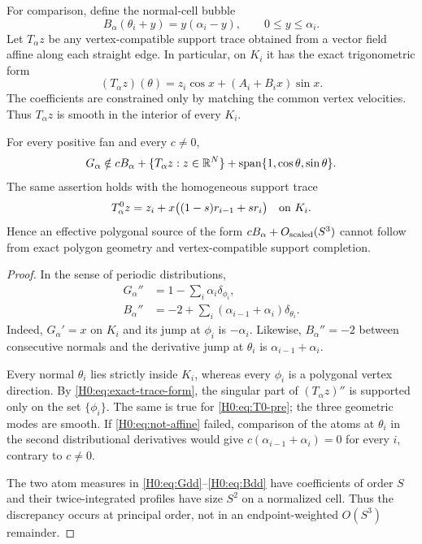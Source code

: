 For comparison, define the normal-cell bubble
\begin{equation}\label{H0:eq:B}
 B_\alpha(\theta_i+y)=y(\alpha_i-y),
 \qquad 0\le y\le\alpha_i.
\end{equation}
Let $T_\alpha z$ be any vertex-compatible support trace obtained from a
vector field affine along each straight edge.  In particular, on $K_i$ it
has the exact trigonometric form
\begin{equation}\label{H0:eq:exact-trace-form}
 (T_\alpha z)(\theta)
 =z_i\cos x+(A_i+B_i x)\sin x.
\end{equation}
The coefficients are constrained only by matching the common vertex
velocities.  Thus $T_\alpha z$ is smooth in the interior of every $K_i$.

\begin{proposition}\label{H0:prop:obstruction}
For every positive fan and every $c\ne0$,
\begin{equation}\label{H0:eq:not-affine}
 G_\alpha\notin cB_\alpha+
 \{T_\alpha z:z\in\mathbb R^N\}+\operatorname {span}\{1,\cos\theta,\sin\theta\}.
\end{equation}
The same assertion holds with the homogeneous support trace
\begin{equation}\label{H0:eq:T0-pre}
 T_\alpha^0z
 =z_i+x\bigl((1-s)r_{i-1}+sr_i\bigr)
 \quad\hbox{on }K_i.
\end{equation}
Hence an effective polygonal source of the form
$cB_\alpha+O_{\rm scaled}(S^3)$ cannot follow from exact polygon geometry
and vertex-compatible support completion.
\end{proposition}

\begin{proof}
In the sense of periodic distributions,
\begin{align}
 G_\alpha''
 &=1-\sum_i\alpha_i\delta_{\phi_i},\label{H0:eq:Gdd}\\
 B_\alpha''
 &=-2+\sum_i(\alpha_{i-1}+\alpha_i)\delta_{\theta_i}.
 \label{H0:eq:Bdd}
\end{align}
Indeed, $G_\alpha'=x$ on $K_i$ and its jump at $\phi_i$ is
$-\alpha_i$.  Likewise, $B_\alpha''=-2$ between consecutive normals and
the derivative jump at $\theta_i$ is $\alpha_{i-1}+\alpha_i$.

Every normal $\theta_i$ lies strictly inside $K_i$, whereas every
$\phi_i$ is a polygonal vertex direction.  By
\eqref{H0:eq:exact-trace-form}, the singular part of
$(T_\alpha z)''$ is supported only on the set $\{\phi_i\}$.  The same is
true for \eqref{H0:eq:T0-pre}; the three geometric modes are smooth.  If
\eqref{H0:eq:not-affine} failed, comparison of the atoms at $\theta_i$ in the
second distributional derivatives would give
$c(\alpha_{i-1}+\alpha_i)=0$ for every $i$, contrary to $c\ne0$.

The two atom measures in \eqref{H0:eq:Gdd}--\eqref{H0:eq:Bdd} have coefficients
of order $S$ and their twice-integrated profiles have size $S^2$ on a
normalized cell.  Thus the discrepancy occurs at principal order, not in
an endpoint-weighted $O(S^3)$ remainder.
\end{proof}

